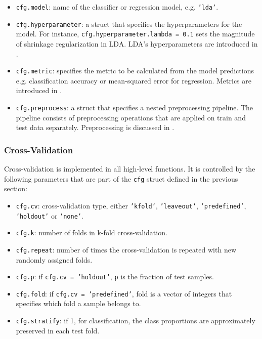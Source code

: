 \documentclass[utf8]{frontiersSCNS} %
\newcommand{\ttt}[1]{\texttt{#1}}
\begin{document}
\begin{itemize}
    \item \ttt{cfg.model}: name of the classifier or regression model, e.g. \ttt{'lda'}.
    \item \ttt{cfg.hyperparameter}: a struct that specifies the hyperparameters for the model. For instance, \ttt{cfg.hyperparameter.lambda = 0.1} sets the magnitude of shrinkage regularization in LDA. LDA's hyperparameters are introduced in .
    \item \ttt{cfg.metric}: specifies the metric to be calculated from the model predictions e.g. classification accuracy or mean-squared error for regression. Metrics are introduced in .
    \item \ttt{cfg.preprocess}: a struct that specifies a nested preprocessing pipeline. The pipeline consists of preprocessing operations that are applied on train and test data separately. Preprocessing is discussed in .
\end{itemize}



\subsubsection{Cross-Validation}

Cross-validation is implemented in all high-level functions. It is controlled by the following parameters that are part of the \ttt{cfg} struct defined in the previous section:

\begin{itemize}
    \item \ttt{cfg.cv}: cross-validation type, either \ttt{'kfold'}, \ttt{'leaveout'}, \ttt{'predefined'}, \ttt{'holdout'} or \ttt{'none'}.
    \item \ttt{cfg.k}: number of folds in k-fold cross-validation.
    \item \ttt{cfg.repeat}: number of times the cross-validation is repeated with new randomly assigned folds.
    \item \ttt{cfg.p}: if \ttt{cfg.cv = 'holdout'}, \ttt{p} is the fraction of test samples.
    \item \ttt{cfg.fold}: if \ttt{cfg.cv = 'predefined'}, fold is a vector of integers that  specifies which fold a sample belongs to.
    \item \ttt{cfg.stratify}: if 1, for classification, the class proportions are approximately preserved in each test fold.
\end{itemize}
\end{document}
